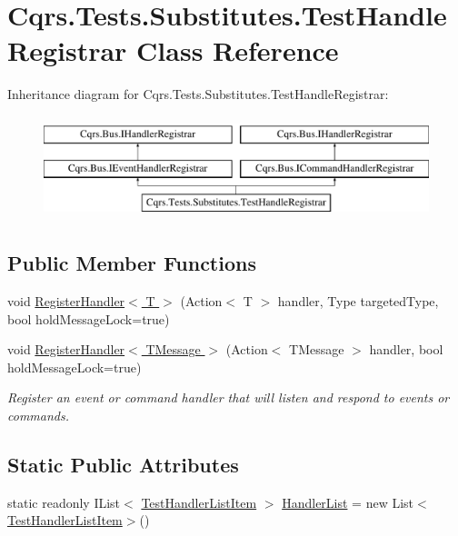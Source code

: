 \hypertarget{classCqrs_1_1Tests_1_1Substitutes_1_1TestHandleRegistrar}{}\section{Cqrs.\+Tests.\+Substitutes.\+Test\+Handle\+Registrar Class Reference}
\label{classCqrs_1_1Tests_1_1Substitutes_1_1TestHandleRegistrar}
Inheritance diagram for Cqrs.\+Tests.\+Substitutes.\+Test\+Handle\+Registrar\+:\begin{figure}[H]
\begin{center}
\leavevmode
\includegraphics[height=3.000000cm]{classCqrs_1_1Tests_1_1Substitutes_1_1TestHandleRegistrar}
\end{center}
\end{figure}
\subsection*{Public Member Functions}
\begin{DoxyCompactItemize}
\item 
void \hyperlink{classCqrs_1_1Tests_1_1Substitutes_1_1TestHandleRegistrar_a0c594dfb7108ec35a3b226fcc2ab84e2}{Register\+Handler$<$ T $>$} (Action$<$ T $>$ handler, Type targeted\+Type, bool hold\+Message\+Lock=true)
\item 
void \hyperlink{classCqrs_1_1Tests_1_1Substitutes_1_1TestHandleRegistrar_a8eb57abc3420b0968c08c05204caa25c}{Register\+Handler$<$ T\+Message $>$} (Action$<$ T\+Message $>$ handler, bool hold\+Message\+Lock=true)
\begin{DoxyCompactList}\small\item\em Register an event or command handler that will listen and respond to events or commands. \end{DoxyCompactList}\end{DoxyCompactItemize}
\subsection*{Static Public Attributes}
\begin{DoxyCompactItemize}
\item 
static readonly I\+List$<$ \hyperlink{classCqrs_1_1Tests_1_1Substitutes_1_1TestHandlerListItem}{Test\+Handler\+List\+Item} $>$ \hyperlink{classCqrs_1_1Tests_1_1Substitutes_1_1TestHandleRegistrar_a56823149a39f6208108030de47e70e09}{Handler\+List} = new List$<$\hyperlink{classCqrs_1_1Tests_1_1Substitutes_1_1TestHandlerListItem}{Test\+Handler\+List\+Item}$>$()
\end{DoxyCompactItemize}


